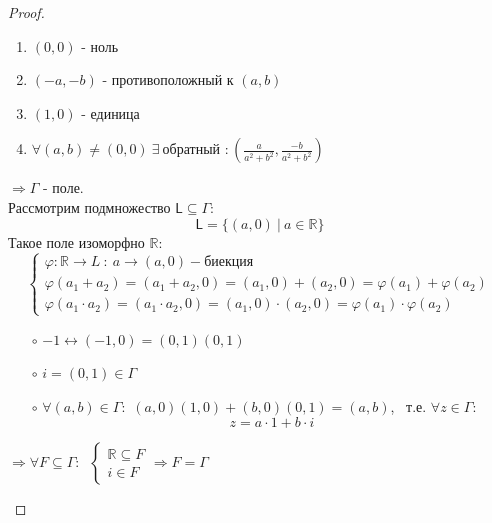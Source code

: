 \documentclass[a4paper, 12pt]{article}
\newcommand{\R}{\mathbb R}
\renewcommand{\phi}{\varphi}
\theoremstyle{definition}
\begin{document}
\begin{proof}
\begin{itemize}
\begin{enumerate}
        \item $(0,0)$ - ноль
        \item $(-a, -b)$ - противоположный к $(a, b)$
        \item $(1, 0)$ - единица
        \item $\forall (a, b) \neq (0, 0) \ \exists \ \text{обратный }: (\frac{a}{a^2+b^2}, \frac{-b}{a^2+b^2})$
      \end{enumerate} $\Longrightarrow \Gamma$ - поле.\\
      Рассмотрим подмножество $\mathsf{L} \subseteq \Gamma: $  
      $$\mathsf{L}  = \{(a, 0) \ | \ a \in \R \}$$   
      Такое поле изоморфно $\R:$
      $$\begin{cases}
        \phi: \R \to L \ : \ a \to (a, 0) - \text{биекция}\\
        \phi(a_1 + a_2) = (a_1 + a_2, 0) = (a_1, 0) + (a_2, 0) = \phi(a_1) + \phi(a_2)\\
        \phi(a_1 \cdot a_2) = (a_1 \cdot a_2, 0) = (a_1, 0) \cdot (a_2, 0) = \phi(a_1) \cdot \phi(a_2)
      \end{cases}$$
      \begin{itemize}
        \item[$\circ$] $-1 \longleftrightarrow (-1, 0) = (0, 1)(0, 1)$
        \item[$\circ$] $i = (0, 1) \in \Gamma$
        \item[$\circ$] $\forall (a, b) \in \Gamma:$
        $(a, 0)(1, 0) + (b, 0)(0, 1) = (a, b)$, \ т.е. $\forall z \in \Gamma:$ 
        $$z = a \cdot 1 + b \cdot i$$
      \end{itemize}
      $\Longrightarrow \forall F \subseteq \Gamma: \ $
         $\begin{cases}
        \R \subseteq F \\
        i \in F
      \end{cases} \Longrightarrow F = \Gamma$
    \end{itemize}
  \end{proof} 
\end{document}
